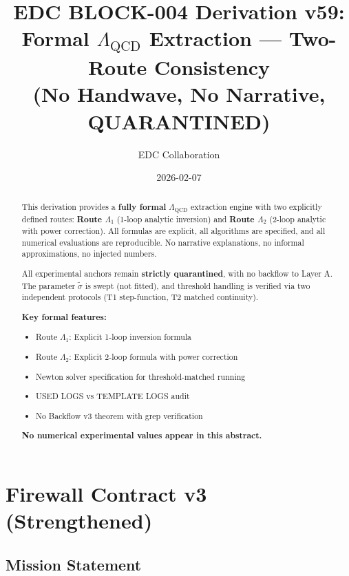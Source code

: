 \documentclass[11pt,a4paper]{article}
\title{%
  \textbf{EDC BLOCK-004 Derivation v59:}\\[0.5em]
  \Large Formal $\Lambda_{\text{QCD}}$ Extraction --- Two-Route Consistency\\[0.3em]
  \large (No Handwave, No Narrative, QUARANTINED)
}
\author{EDC Collaboration}
\date{2026-02-07}
\theoremstyle{definition}
\begin{document}
\maketitle

\begin{abstract}
This derivation provides a \textbf{fully formal} $\Lambda_{\text{QCD}}$
extraction engine with two explicitly defined routes:
\textbf{Route $\Lambda_1$} (1-loop analytic inversion) and
\textbf{Route $\Lambda_2$} (2-loop analytic with power correction).
All formulas are explicit, all algorithms are specified, and all
numerical evaluations are reproducible. No narrative explanations,
no informal approximations, no injected numbers.

All experimental anchors remain \textbf{strictly quarantined},
with no backflow to Layer A. The parameter $\tilde{\sigma}$ is swept
(not fitted), and threshold handling is verified via two independent
protocols (T1 step-function, T2 matched continuity).

\textbf{Key formal features:}
\begin{itemize}
  \item Route $\Lambda_1$: Explicit 1-loop inversion formula
  \item Route $\Lambda_2$: Explicit 2-loop formula with power correction
  \item Newton solver specification for threshold-matched running
  \item USED LOGS vs TEMPLATE LOGS audit
  \item No Backflow v3 theorem with grep verification
\end{itemize}

\textbf{No numerical experimental values appear in this abstract.}
\end{abstract}

\tableofcontents
\newpage

\section{Firewall Contract v3 (Strengthened)}
\label{sec:firewall}

\subsection{Mission Statement}
\label{subsec:mission}
\end{document}
